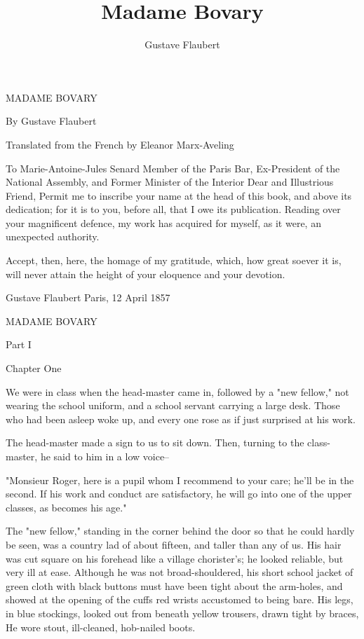 \documentclass[11pt,twocolumn]{ltugboat}
\title{Madame Bovary }
\author{Gustave Flaubert}
\begin{document}
\maketitle


MADAME BOVARY

By Gustave Flaubert

Translated from the French by Eleanor Marx-Aveling


To Marie-Antoine-Jules Senard Member of the Paris Bar, Ex-President
of the National Assembly, and Former Minister of the Interior Dear and
Illustrious Friend, Permit me to inscribe your name at the head of this
book, and above its dedication; for it is to you, before all, that I
owe its publication. Reading over your magnificent defence, my work has
acquired for myself, as it were, an unexpected authority.

Accept, then, here, the homage of my gratitude, which, how great soever
it is, will never attain the height of your eloquence and your devotion.

Gustave Flaubert Paris, 12 April 1857




MADAME BOVARY




Part I



Chapter One

We were in class when the head-master came in, followed by a "new
fellow," not wearing the school uniform, and a school servant carrying a
large desk. Those who had been asleep woke up, and every one rose as if
just surprised at his work.

The head-master made a sign to us to sit down. Then, turning to the
class-master, he said to him in a low voice--

"Monsieur Roger, here is a pupil whom I recommend to your care; he'll be
in the second. If his work and conduct are satisfactory, he will go into
one of the upper classes, as becomes his age."

The "new fellow," standing in the corner behind the door so that he
could hardly be seen, was a country lad of about fifteen, and taller
than any of us. His hair was cut square on his forehead like a village
chorister's; he looked reliable, but very ill at ease. Although he was
not broad-shouldered, his short school jacket of green cloth with black
buttons must have been tight about the arm-holes, and showed at the
opening of the cuffs red wrists accustomed to being bare. His legs, in
blue stockings, looked out from beneath yellow trousers, drawn tight by
braces, He wore stout, ill-cleaned, hob-nailed boots.
\end{document}
